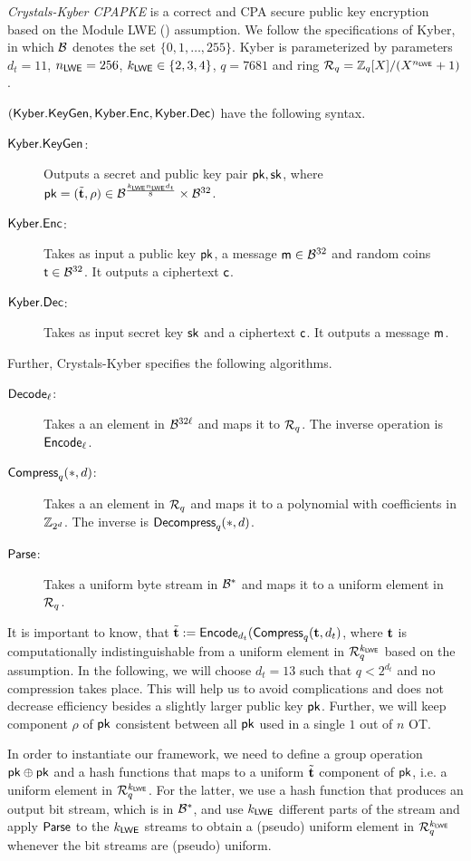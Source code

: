 \begin{definition}
\emph{ Crystals-Kyber CPAPKE} is a correct and CPA secure public key encryption based on the Module LWE (\MLWE) assumption. We follow the specifications of Kyber, in which $\mathcal{B}$ denotes the  set $\{0,1,\ldots,255\}$. Kyber is parameterized by parameters $d_t=11$, $n_{\mathsf{LWE}}=256$, $k_{\mathsf{LWE}}\in\{2,3,4\}$, $q=7681$ and ring $\mathcal R_q=\mathbb Z_q[ X]/(X^{n_{\mathsf{LWE}}}+1)$. 

$(\mathsf{Kyber.KeyGen},\mathsf{Kyber.Enc},\mathsf{Kyber.Dec})$ have the following syntax. 
\begin{description}
\item[$\mathsf{Kyber.KeyGen}$:] Outputs a secret and public key pair $\mathsf{pk},\mathsf{sk}$, where $\mathsf{pk}=(\tilde{{\mathbf t}},\rho)\in\mathcal{B}^{\frac{k_{\mathsf{LWE}}n_{\mathsf{LWE}} d_t}{8}}\times\mathcal{B}^{32}$.
\item[$\mathsf{Kyber.Enc}$:] Takes as input a public key $\mathsf{pk}$, a message $\mathsf{m}\in\mathcal{B}^{32}$ and random coins $\mathsf{t}\in\mathcal{B}^{32}$. It outputs a ciphertext $\mathsf{c}$.
\item[$\mathsf{Kyber.Dec}$:] Takes as input secret key $\mathsf{sk}$ and a ciphertext $\mathsf{c}$. It outputs a message $\mathsf{m}$.
\end{description}
Further, Crystals-Kyber specifies the following algorithms.
\begin{description}
\item[$\mathsf{Decode}_\ell$:] Takes a an element in $\mathcal{B}^{32\ell}$ and maps it to $\mathcal R_q$. The inverse operation is $\mathsf{Encode}_\ell$.
\item[$\mathsf{Compress}_q(*,d)$:] Takes a an element in $\mathcal R_q$ and maps it to a polynomial with coefficients in $\mathbb Z_{2^d}$. The inverse is $\mathsf{Decompress}_q(*,d)$.
\item[$\mathsf{Parse}$:] Takes a uniform byte stream in $\mathcal{B}^{*}$ and maps it to a uniform element in $\mathcal R_q$.
\end{description}
\end{definition}

It is important to know, that $\tilde{{\mathbf t}}:=\mathsf{Encode}_{d_t}(\mathsf{Compress}_q({\mathbf t}, d_t)$, where ${\mathbf t}$ is computationally indistinguishable from a uniform element in $\mathcal R_q^{k_{\mathsf{LWE}}}$ based on the \MLWE assumption. In the following, we will choose $d_t=13$ such that $q<2^{d_t}$ and no compression takes place. This will help us to avoid complications and does not decrease efficiency besides a slightly larger public key $\mathsf{pk}$. Further, we will keep component $\rho$ of $\mathsf{pk}$ consistent between all $\mathsf{pk}$ used in a single $1$ out of $n$ OT.

In order to instantiate our framework, we need to define a group operation $\mathsf{pk}\oplus\mathsf{pk}$ and a hash functions that maps to a uniform $\tilde{{\mathbf t}}$ component of $\mathsf{pk}$, i.e. a uniform element in $\mathcal R_q^{k_{\mathsf{LWE}}}$. For the latter, we use a hash function that produces an output bit stream, which is in $\mathcal{B}^{*}$, and use $k_{\mathsf{LWE}}$ different parts of the stream and apply $\mathsf{Parse}$ to the $k_{\mathsf{LWE}}$ streams to obtain a (pseudo) uniform element in $\mathcal R_q^{k_{\mathsf{LWE}}}$ whenever the bit streams are (pseudo) uniform.


